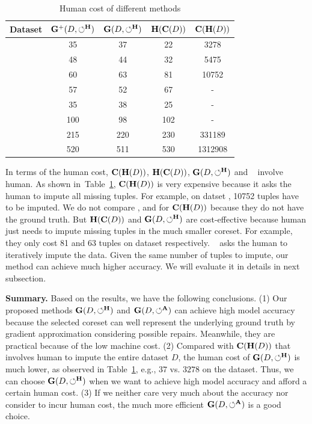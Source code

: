 \begin{table}
	\centering
	\caption{Human cost of different methods}
	\vspace{-1.2em}
	\small
	\begin{tabular}{ccccc}
		\hline
		Dataset & $\mathbf{G}^+(D,\circlearrowleft^\mathbf{H})$ & $\mathbf{G}(D,\circlearrowleft^\mathbf{H})$ & $\mathbf{H}(\mathbf{C}(D))$ & $\mathbf{C}(\mathbf{H}(D))$\\
		\hline
		\nursery & 35 & 37 & 22 & 3278\\
		\hr & 48 & 44 & 32 & 5475\\
		\adult & 60 & 63 & 81 & 10752\\
		\credit & 57 & 52 & 67 & -\\
		\bike & 35 & 38 & 25 & -\\
		\air & 100 & 98 & 102 & -\\
		\imdb & 215 & 220 & 230 & 331189\\
		\imdbl & 520 & 511 & 530 & 1312908 \\
		\hline
	\end{tabular}
	\label{tbl:humancost}
	\vspace{-1em}
\end{table}


 In terms of the human cost, $\mathbf{C}(\mathbf{H}(D))$, $\mathbf{H}(\mathbf{C}(D))$, $\mathbf{G}(D,\circlearrowleft^\mathbf{H})$ and  \actclean~ involve human. As shown in~Table~\ref{tbl:humancost}, $\mathbf{C}(\mathbf{H}(D))$ is very expensive because it asks the human to impute all missing tuples. For example, on datset \adult, 10752 tuples have to be imputed. We do not compare \credit, \bike and \air for $\mathbf{C}(\mathbf{H}(D))$ because they do not have the ground truth.
 But $\mathbf{H}(\mathbf{C}(D))$ and $\mathbf{G}(D,\circlearrowleft^\mathbf{H})$ are cost-effective because human just needs to impute missing tuples in the much smaller coreset. For example, they only cost 81 and 63 tuples on dataset \adult respectively. 
\actclean~ asks the human to iteratively impute the data. Given the same number of tuples to impute, our method can achieve much higher accuracy. We will  evaluate it in details in next subsection.

\noindent \textbf{Summary.} 
Based on the results, we have the following conclusions.
(1) Our proposed methods $\mathbf{G}(D,\circlearrowleft^\mathbf{H})$ and $\mathbf{G}(D,\circlearrowleft^\mathbf{A})$ can achieve high model accuracy because the selected coreset can well represent the underlying ground truth by gradient approximation considering possible repairs. Meanwhile, they are practical because of the low machine cost. (2) Compared with $\mathbf{C}(\mathbf{H}(D))$ that involves human to impute the entire dataset $D$, the human cost of $\mathbf{G}(D,\circlearrowleft^\mathbf{H})$ is much lower, as observed in Table~\ref{tbl:humancost}, e.g., $37$ vs. $3278$ on the \nursery dataset. Thus, we can choose $\mathbf{G}(D,\circlearrowleft^\mathbf{H})$ when we want to achieve high model accuracy and afford a certain human cost. (3) 
If we neither care very much about the accuracy nor consider to incur human cost, the much more efficient $\mathbf{G}(D,\circlearrowleft^\mathbf{A})$ is a good choice.